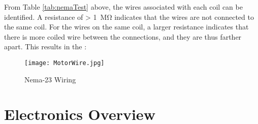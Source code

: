 From Table \ref{tab:nemaTest} above, the wires associated with each coil can be identified. A resistance of > \SI{1}{\mega\ohm} indicates that the wires are not connected to the same coil. For the wires on the same coil, a larger resistance indicates that there is more coiled wire between the connections, and they are thus farther apart. This results in the :

\begin{figure}[H]
	\begin{center}
		\texttt{[image: MotorWire.jpg]}
		\caption{Nema-23 Wiring}
		\label{fig:motorWire}
	\end{center}
\end{figure}

\section{Electronics Overview}
